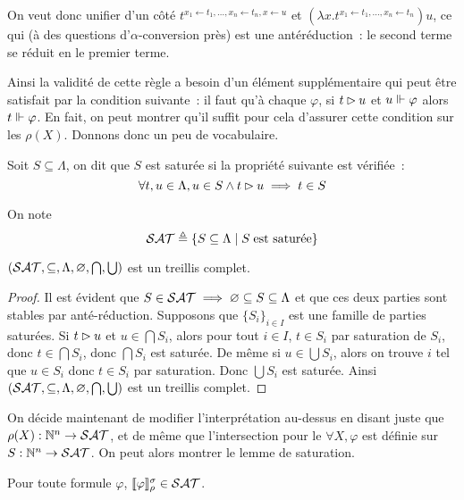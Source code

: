 \documentclass{article}
\begin{document}
On veut donc unifier d'un côté $t^{x_1\leftarrow t_1,\ldots,x_n\leftarrow t_n, x\leftarrow u}$ et $(\lambda x.t^{x_1\leftarrow t_1,\ldots,x_n\leftarrow t_n})u$, ce qui (à des questions d'$\alpha$-conversion près) est une antéréduction~: le second terme se réduit en le premier terme.

Ainsi la validité de cette règle a besoin d'un élément supplémentaire qui peut être satisfait par la condition suivante~: il faut qu'à chaque $\varphi$, si $t\rhd u$ et $u\Vdash \varphi$ alors $t\Vdash \varphi$. En fait, on peut montrer qu'il suffit pour cela d'assurer cette condition sur les $\rho(X)$. Donnons donc un peu de vocabulaire.

\begin{defi}
  Soit $S\subseteq\Lambda$, on dit que $S$ est saturée si la propriété suivante est vérifiée~:
  \[\forall t,u\in\Lambda, u \in S \land t \rhd u \implies t \in S\]

  On note
  \[\mathcal {SAT} \triangleq \{S\subseteq \Lambda\mid S\;\text{est saturée}\}\]
\end{defi}

\begin{lem}
  $(\mathcal {SAT},\subseteq,\Lambda,\varnothing,\bigcap,\bigcup)$ est un treillis complet.
\end{lem}

\begin{proof}
  Il est évident que $S\in \mathcal {SAT} \implies \varnothing\subseteq S \subseteq \Lambda$ et que ces deux parties sont stables par anté-réduction. Supposons que $\{S_i\}_{i\in I}$ est une famille de parties saturées. Si $t\rhd u$ et $u \in \bigcap S_i$, alors pour tout $i \in I$, $t \in S_i$ par saturation de $S_i$, donc $t\in \bigcap S_i$, donc $\bigcap S_i$ est saturée. De même si $u \in \bigcup S_i$, alors on trouve $i$ tel que $u \in S_i$ donc $t\in S_i$ par saturation. Donc $\bigcup S_i$ est saturée. Ainsi $(\mathcal {SAT},\subseteq,\Lambda,\varnothing, \bigcap,\bigcup)$ est un treillis complet.
\end{proof}

On décide maintenant de modifier l'interprétation au-dessus en disant juste que $\rho(X) : \mathbb{N}^n \to \mathcal {SAT}$, et de même que l'intersection pour le $\forall X, \varphi$ est définie sur $S : \mathbb{N}^n \to \mathcal {SAT}$. On peut alors montrer le lemme de saturation.

\begin{lem}[Saturation]
  Pour toute formule $\varphi$, $\llbracket \varphi \rrbracket_\rho^\sigma\in \mathcal {SAT}$.
\end{lem}
\end{document}
